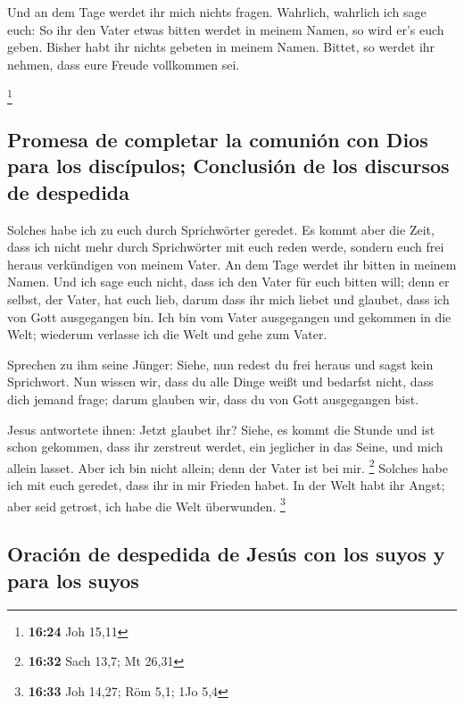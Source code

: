  Und an dem Tage werdet ihr mich nichts fragen. Wahrlich,
wahrlich ich sage euch: So ihr den Vater etwas bitten werdet in meinem
Namen, so wird er's euch geben.  Bisher habt ihr nichts
gebeten in meinem Namen. Bittet, so werdet ihr nehmen, dass eure Freude
vollkommen sei.

\footnote{\textbf{16:24} Joh 15,11}

\hypertarget{promesa-de-completar-la-comuniuxf3n-con-dios-para-los-discuxedpulos-conclusiuxf3n-de-los-discursos-de-despedida}{%
\subsection{Promesa de completar la comunión con Dios para los
discípulos; Conclusión de los discursos de
despedida}\label{promesa-de-completar-la-comuniuxf3n-con-dios-para-los-discuxedpulos-conclusiuxf3n-de-los-discursos-de-despedida}}

 Solches habe ich zu euch durch Sprichwörter geredet. Es
kommt aber die Zeit, dass ich nicht mehr durch Sprichwörter mit euch
reden werde, sondern euch frei heraus verkündigen von meinem Vater.
 An dem Tage werdet ihr bitten in meinem Namen. Und ich
sage euch nicht, dass ich den Vater für euch bitten will;
 denn er selbst, der Vater, hat euch lieb, darum dass ihr
mich liebet und glaubet, dass ich von Gott ausgegangen bin.
 Ich bin vom Vater ausgegangen und gekommen in die Welt;
wiederum verlasse ich die Welt und gehe zum Vater.

 Sprechen zu ihm seine Jünger: Siehe, nun redest du frei
heraus und sagst kein Sprichwort.  Nun wissen wir, dass
du alle Dinge weißt und bedarfst nicht, dass dich jemand frage; darum
glauben wir, dass du von Gott ausgegangen bist.

 Jesus antwortete ihnen: Jetzt glaubet ihr?
 Siehe, es kommt die Stunde und ist schon gekommen, dass
ihr zerstreut werdet, ein jeglicher in das Seine, und mich allein
lasset. Aber ich bin nicht allein; denn der Vater ist bei mir.
\footnote{\textbf{16:32} Sach 13,7; Mt 26,31}  Solches
habe ich mit euch geredet, dass ihr in mir Frieden habet. In der Welt
habt ihr Angst; aber seid getrost, ich habe die Welt überwunden.
\footnote{\textbf{16:33} Joh 14,27; Röm 5,1; 1Jo 5,4}

\hypertarget{oraciuxf3n-de-despedida-de-jesuxfas-con-los-suyos-y-para-los-suyos}{%
\subsection{Oración de despedida de Jesús con los suyos y para los
suyos}\label{oraciuxf3n-de-despedida-de-jesuxfas-con-los-suyos-y-para-los-suyos}}

